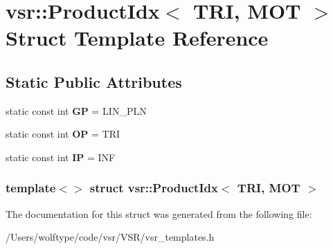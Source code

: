\hypertarget{structvsr_1_1_product_idx_3_01_t_r_i_00_01_m_o_t_01_4}{\section{vsr\-:\-:Product\-Idx$<$ T\-R\-I, M\-O\-T $>$ Struct Template Reference}
\label{structvsr_1_1_product_idx_3_01_t_r_i_00_01_m_o_t_01_4}
}
\subsection*{Static Public Attributes}
\begin{DoxyCompactItemize}
\item 
\hypertarget{structvsr_1_1_product_idx_3_01_t_r_i_00_01_m_o_t_01_4_a66aa45f9bc935fa6fa7a5681dbd42d90}{static const int {\bfseries G\-P} = L\-I\-N\-\_\-\-P\-L\-N}\label{structvsr_1_1_product_idx_3_01_t_r_i_00_01_m_o_t_01_4_a66aa45f9bc935fa6fa7a5681dbd42d90}

\item 
\hypertarget{structvsr_1_1_product_idx_3_01_t_r_i_00_01_m_o_t_01_4_a82a231bf44c8fdef2e81ac376631fb54}{static const int {\bfseries O\-P} = T\-R\-I}\label{structvsr_1_1_product_idx_3_01_t_r_i_00_01_m_o_t_01_4_a82a231bf44c8fdef2e81ac376631fb54}

\item 
\hypertarget{structvsr_1_1_product_idx_3_01_t_r_i_00_01_m_o_t_01_4_af82ee1ddcea41b14bb1083987400b2ae}{static const int {\bfseries I\-P} = I\-N\-F}\label{structvsr_1_1_product_idx_3_01_t_r_i_00_01_m_o_t_01_4_af82ee1ddcea41b14bb1083987400b2ae}

\end{DoxyCompactItemize}
\subsubsection*{template$<$$>$ struct vsr\-::\-Product\-Idx$<$ T\-R\-I, M\-O\-T $>$}



The documentation for this struct was generated from the following file\-:\begin{DoxyCompactItemize}
\item 
/\-Users/wolftype/code/vsr/\-V\-S\-R/vsr\-\_\-templates.\-h\end{DoxyCompactItemize}
